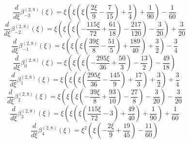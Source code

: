 
\begin{equation}
\frac{d}{d\xi}\beta_{-3}^{(2,8)} (\xi) =
 \xi \left(\xi \left(\xi \left(\frac{2 \xi}{9}
 - \frac{7}{15}\right) + \frac{1}{4}\right) + \frac{1}{90}\right) - \frac{1}{60}
\end{equation}
\begin{equation}
\frac{d}{d\xi}\beta_{-2}^{(2,8)} (\xi) =
 \xi \left(\xi \left(\xi \left(- \frac{115 \xi}{72}
 + \frac{61}{18}\right) - \frac{217}{120}\right) - \frac{3}{20}\right) + \frac{3}{20}
\end{equation}
\begin{equation}
\frac{d}{d\xi}\beta_{-1}^{(2,8)} (\xi) =
 \xi \left(\xi \left(\xi \left(\frac{39 \xi}{8}
 - \frac{51}{5}\right) + \frac{189}{40}\right) + \frac{3}{2}\right) - \frac{3}{4}
\end{equation}
\begin{equation}
\frac{d}{d\xi}\beta_{0}^{(2,8)} (\xi) =
 \xi \left(\xi \left(\xi \left(- \frac{295 \xi}{36} + \frac{50}{3}\right) - \frac{13}{2}\right) - \frac{49}{18}\right)
\end{equation}
\begin{equation}
\frac{d}{d\xi}\beta_{1}^{(2,8)} (\xi) =
 \xi \left(\xi \left(\xi \left(\frac{295 \xi}{36}
 - \frac{145}{9}\right) + \frac{17}{3}\right) + \frac{3}{2}\right) + \frac{3}{4}
\end{equation}
\begin{equation}
\frac{d}{d\xi}\beta_{2}^{(2,8)} (\xi) =
 \xi \left(\xi \left(\xi \left(- \frac{39 \xi}{8}
 + \frac{93}{10}\right) - \frac{27}{8}\right) - \frac{3}{20}\right) - \frac{3}{20}
\end{equation}
\begin{equation}
\frac{d}{d\xi}\beta_{3}^{(2,8)} (\xi) =
 \xi \left(\xi \left(\xi \left(\frac{115 \xi}{72} - 3\right) + \frac{49}{40}\right) + \frac{1}{90}\right) + \frac{1}{60}
\end{equation}
\begin{equation}
\frac{d}{d\xi}\beta_{4}^{(2,8)} (\xi) =
 \xi^{2} \left(\xi \left(- \frac{2 \xi}{9} + \frac{19}{45}\right) - \frac{11}{60}\right)
\end{equation}
